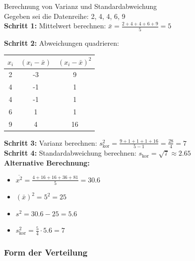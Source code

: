 \begin{example2}{Berechnung von Varianz und Standardabweichung}\\
Gegeben sei die Datenreihe: 2, 4, 4, 6, 9
\vspace{2mm}\\
\textbf{Schritt 1:} Mittelwert berechnen:
$\bar{x} = \frac{2 + 4 + 4 + 6 + 9}{5} = 5$

\textbf{Schritt 2:} Abweichungen quadrieren:
\begin{center}
\begin{tabular}{|c|c|c|}
\hline
$x_i$ & $(x_i - \bar{x})$ & $(x_i - \bar{x})^2$ \\
\hline
2 & -3 & 9 \\
4 & -1 & 1 \\
4 & -1 & 1 \\
6 & 1 & 1 \\
9 & 4 & 16 \\
\hline
\end{tabular}
\end{center}

\textbf{Schritt 3:} Varianz berechnen:
$s_{\text{kor}}^2 = \frac{9 +1 + 1 + 1 + 16}{5-1} = \frac{28}{4} = 7$
\vspace{1mm}\\
\textbf{Schritt 4:} Standardabweichung berechnen:
$s_{\text{kor}} = \sqrt{7} \approx 2.65$
\vspace{2mm}\\
\textbf{Alternative Berechnung:}
\vspace{1mm}\\
\begin{itemize}
    \setlength{\itemsep}{1pt}
    \item $\overline{x^2} = \frac{4 + 16 + 16 + 36 + 81}{5} = 30.6$
    \item $(\bar{x})^2 = 5^2 = 25$
    \item $s^2 = 30.6 - 25 = 5.6$
    \item $s_{\text{kor}}^2 = \frac{5}{4} \cdot 5.6 = 7$
\end{itemize}
\end{example2}

\subsubsection{Form der Verteilung}


